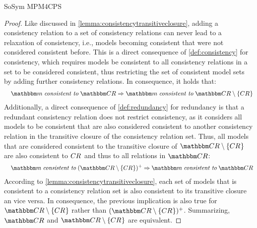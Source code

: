 \begin{copiedFrom}{SoSym MPM4CPS}
\begin{proof}
    Like discussed in \autoref{lemma:consistencytransitiveclosure}, adding a consistency relation to a set of consistency relations can never lead to a relaxation of consistency, i.e., models becoming consistent that were not considered consistent before. This is a direct consequence of \autoref{def:consistency} for consistency, which requires models be consistent to all consistency relations in a set to be considered consistent, thus restricting the set of consistent model sets by adding further consistency relations.
    In consequence, it holds that:
    \begin{align*}
        \formulaskip
        \modelset{m} \consistenttomath \consistencyrelationset{CR} \Rightarrow 
        \modelset{m} \consistenttomath \consistencyrelationset{CR} \setminus \setted{\consistencyrelation{CR}{}}
    \end{align*}
    Additionally, a direct consequence of \autoref{def:redundancy} for redundancy is that a redundant consistency relation does not restrict consistency, as it considers all models to be consistent that are also considered consistent to another consistency relation in the transitive closure of the consistency relation set. Thus, all models that are considered consistent to the transitive closure of $\consistencyrelationset{CR} \setminus \setted{\consistencyrelation{CR}{}}$ are also consistent to $CR_{}$ and thus to all relations in $\consistencyrelationset{CR}$:
    \begin{align*}
        \formulaskip
        \modelset{m} \consistenttomath \transitiveclosure{(\consistencyrelationset{CR} \setminus \setted{\consistencyrelation{CR}{}})} \Rightarrow 
        \modelset{m} \consistenttomath \consistencyrelationset{CR}
    \end{align*}
    According to \autoref{lemma:consistencytransitiveclosure}, each set of models that is consistent to a consistency relation set is also consistent to its transitive closure an vice versa.
    In consequence, the previous implication is also true for $\consistencyrelationset{CR} \setminus \setted{\consistencyrelation{CR}{}}$ rather than $\transitiveclosure{(\consistencyrelationset{CR} \setminus \setted{\consistencyrelation{CR}{}})}$.
    Summarizing, $\consistencyrelationset{CR}$ and $\consistencyrelationset{CR} \setminus \setted{\consistencyrelation{CR}{}}$ are equivalent.
\end{proof}


\end{copiedFrom}
